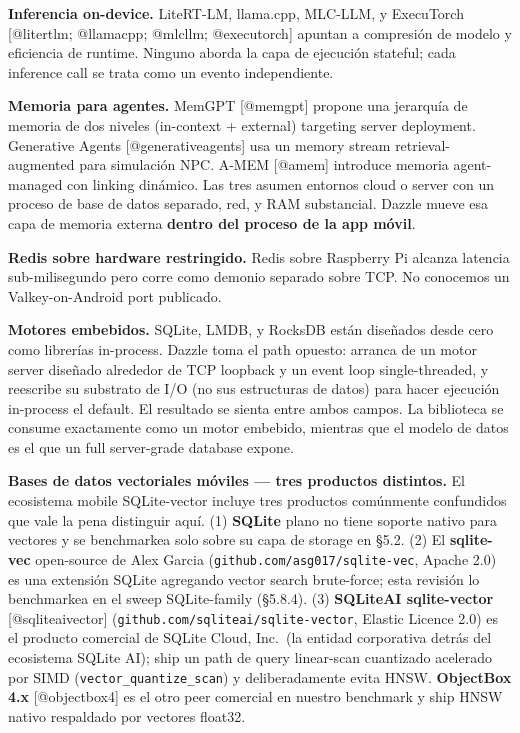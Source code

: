 \textbf{Inferencia on-device.} LiteRT-LM, llama.cpp, MLC-LLM, y ExecuTorch
{[}@litertlm; @llamacpp; @mlcllm; @executorch{]} apuntan a compresión de modelo
y eficiencia de runtime. Ninguno aborda la capa de ejecución stateful; cada
inference call se trata como un evento independiente.

\textbf{Memoria para agentes.} MemGPT {[}@memgpt{]} propone una jerarquía de
memoria de dos niveles (in-context + external) targeting server deployment.
Generative Agents {[}@generativeagents{]} usa un memory stream
retrieval-augmented para simulación NPC. A-MEM {[}@amem{]} introduce memoria
agent-managed con linking dinámico. Las tres asumen entornos cloud o server con
un proceso de base de datos separado, red, y RAM substancial. Dazzle mueve esa
capa de memoria externa \textbf{dentro del proceso de la app móvil}.

\textbf{Redis sobre hardware restringido.} Redis sobre Raspberry Pi alcanza
latencia sub-milisegundo pero corre como demonio separado sobre TCP. No
conocemos un Valkey-on-Android port publicado.

\textbf{Motores embebidos.} SQLite, LMDB, y RocksDB están diseñados desde cero
como librerías in-process. Dazzle toma el path opuesto: arranca de un motor
server diseñado alrededor de TCP loopback y un event loop single-threaded, y
reescribe su substrato de I/O (no sus estructuras de datos) para hacer ejecución
in-process el default. El resultado se sienta entre ambos campos. La biblioteca
se consume exactamente como un motor embebido, mientras que el modelo de datos
es el que un full server-grade database expone.

\textbf{Bases de datos vectoriales móviles --- tres productos distintos.} El
ecosistema mobile SQLite-vector incluye tres productos comúnmente confundidos
que vale la pena distinguir aquí. (1) \textbf{SQLite} plano no tiene soporte
nativo para vectores y se benchmarkea solo sobre su capa de storage en §5.2. (2)
El \textbf{sqlite-vec} open-source de Alex Garcia
(\texttt{github.com/asg017/sqlite-vec}, Apache 2.0) es una extensión SQLite
agregando vector search brute-force; esta revisión lo benchmarkea en el sweep
SQLite-family (§5.8.4). (3) \textbf{SQLiteAI sqlite-vector}
{[}@sqliteaivector{]} (\texttt{github.com/sqliteai/sqlite-vector}, Elastic
Licence 2.0) es el producto comercial de SQLite Cloud, Inc.~(la entidad
corporativa detrás del ecosistema SQLite AI); ship un path de query linear-scan
cuantizado acelerado por SIMD (\texttt{vector\_quantize\_scan}) y
deliberadamente evita HNSW. \textbf{ObjectBox 4.x} {[}@objectbox4{]} es el otro
peer comercial en nuestro benchmark y ship HNSW nativo respaldado por vectores
float32.

